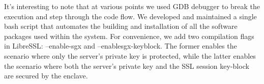 \documentclass[../main.tex]{subfiles}
\begin{document}
It’s interesting to note that at various points we used GDB debugger to break the execution and
step through the code flow. We developed and maintained a single bash script that automates the 
building and installation of all the software packages used within the system. For convenience, 
we add two compilation flags in LibreSSL: –enable-sgx and –enablesgx-keyblock. The former enables
the scenario where only the server’s private key is protected, while the latter enables the scenario
where both the server’s private key and the SSL session key-block are secured by the enclave.
\end{document}
